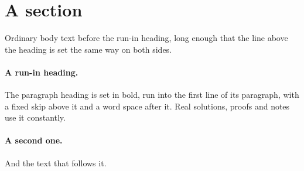 \documentclass{article}
\begin{document}
\section{A section}

Ordinary body text before the run-in heading, long enough that the line above
the heading is set the same way on both sides.

\paragraph{A run-in heading.} The paragraph heading is set in bold, run into
the first line of its paragraph, with a fixed skip above it and a word space
after it. Real solutions, proofs and notes use it constantly.

\paragraph{A second one.} And the text that follows it.
\end{document}
